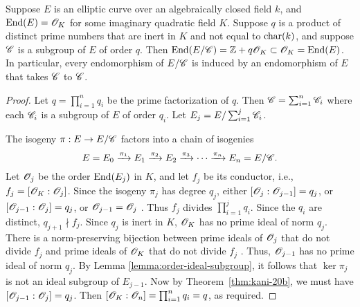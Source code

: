 \documentclass{amsart}
\begin{document}
\begin{lemma}\label{lem:c-end}
  Suppose $E$ is an elliptic curve over an algebraically closed field $k$, and $\operatorname{End}(E) = \mathscr{O}_K$ for some imaginary quadratic field $K$. Suppose $q$ is a product of distinct prime numbers that are inert in $K$ and not equal to $\operatorname{char}(k)$, and suppose $\mathscr{C}$ is a subgroup of $E$ of order $q$. Then $\operatorname{End}(E/\mathscr{C}) = \mathbb{Z} + q\mathscr{O}_K \subset \mathscr{O}_K = \operatorname{End}(E)$. In particular, every endomorphism of $E/\mathscr{C}$ is induced by an endomorphism of $E$ that takes $\mathscr{C}$ to $\mathscr{C}$.
\end{lemma}
\begin{proof}
  Let $q = \prod_{i=1}^n q_i$ be the prime factorization of $q$.
  Then $\mathscr{C} = \sum_{i=1}^n \mathscr{C}_i$ where each $\mathscr{C}_i$ is a subgroup of $E$ of order $q_i$. Let $E_j = E/\sum_{i=1}^j\mathscr{C}_i$.
 
  The isogeny $\pi: E \to E/\mathscr{C}$ factors into a chain of isogenies
   \[
    E = E_0
    \xrightarrow{\pi_1}
    E_1
    \xrightarrow{\pi_2}
    E_2
    \xrightarrow{\pi_3}
    \cdots
    \xrightarrow{\pi_n}
    E_n = E/\mathscr{C}.
  \]
  Let $\mathscr{O}_j$ be the order $\operatorname{End}(E_j)$ in $K$, and let $f_j$ be its conductor, i.e., $f_j = [\mathscr{O}_{K} : \mathscr{O}_j]$. Since the isogeny $\pi_j$ has degree $q_j$, either $[\mathscr{O}_j : \mathscr{O}_{j-1}] = q_j$, or $[\mathscr{O}_{j-1} : \mathscr{O}_j] = q_j$, or $\mathscr{O}_{j-1} = \mathscr{O}_j$ \cite[Prop.~5]{kohel1996endomorphism}. Thus $f_j$ divides $\prod_{i=1}^{j}q_i$. Since the $q_i$ are distinct, $q_{j+1} \nmid f_j$. 
  Since $q_j$ is inert in $K$, $\mathscr{O}_K$ has no prime ideal of norm $q_j$. There is a norm-preserving bijection between prime ideals of $\mathscr{O}_{j}$ that do not divide $f_{j}$ and prime ideals of $\mathscr{O}_K$ that do not divide $f_{j}$ \cite[Prop.~7.20]{cox2011primes}. Thus, $\mathscr{O}_{j-1}$ has no prime ideal of norm $q_j$. 
By Lemma \ref{lemma:order-ideal-subgroup}, it follows that $\ker\pi_j$ is not an ideal subgroup of $E_{j-1}$. %
Now by Theorem~\ref{thm:kani-20b}, we must have $[\mathscr{O}_{j-1} : \mathscr{O}_j] = q_j$. Then $[\mathscr{O}_K : \mathscr{O}_n] = \prod_{i=1}^n q_i = q$, as required.
\end{proof}
\end{document}
